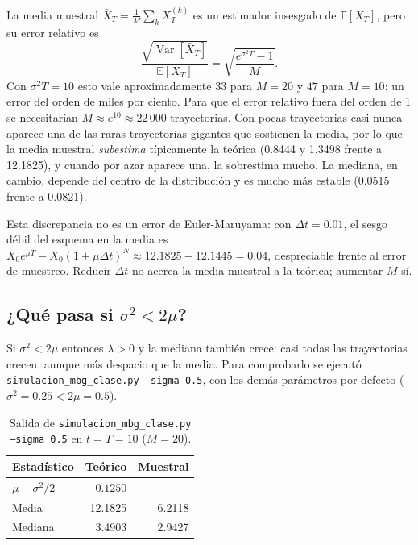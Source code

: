 \documentclass[11pt,a4paper]{article}
\newcommand{\E}{\mathbb{E}}
\newcommand{\Var}{\operatorname{Var}}
\begin{document}
La media muestral $\bar X_T = \frac1M \sum_k X_T^{(k)}$ es un estimador insesgado de $\E[X_T]$, pero su error relativo es
\begin{equation}
    \frac{\sqrt{\Var[\bar X_T]}}{\E[X_T]} = \sqrt{\frac{e^{\sigma^2 T} - 1}{M}}.
\end{equation}
Con $\sigma^2T = 10$ esto vale aproximadamente $33$ para $M = 20$ y $47$ para $M = 10$: un error del orden de miles por ciento. Para que el error relativo fuera del orden de 1 se necesitarían $M \approx e^{10} \approx 22\,000$ trayectorias. Con pocas trayectorias casi nunca aparece una de las raras trayectorias gigantes que sostienen la media, por lo que la media muestral \emph{subestima} típicamente la teórica (0.8444 y 1.3498 frente a 12.1825), y cuando por azar aparece una, la sobrestima mucho. La mediana, en cambio, depende del centro de la distribución y es mucho más estable (0.0515 frente a 0.0821).

Esta discrepancia no es un error de Euler-Maruyama: con $\Delta t = 0.01$, el sesgo débil del esquema en la media es $X_0e^{\mu T} - X_0(1 + \mu\Delta t)^N \approx 12.1825 - 12.1445 = 0.04$, despreciable frente al error de muestreo. Reducir $\Delta t$ no acerca la media muestral a la teórica; aumentar $M$ sí.

\subsection{\texorpdfstring{¿Qué pasa si $\sigma^2 < 2\mu$?}{¿Qué pasa si sigma² < 2 mu?}}

Si $\sigma^2 < 2\mu$ entonces $\lambda > 0$ y la mediana también crece: casi todas las trayectorias crecen, aunque más despacio que la media. Para comprobarlo se ejecutó \texttt{simulacion\_mbg\_clase.py --sigma 0.5}, con los demás parámetros por defecto ($\sigma^2 = 0.25 < 2\mu = 0.5$).

\begin{table}[H]
    \centering
    \caption{Salida de \texttt{simulacion\_mbg\_clase.py --sigma 0.5} en $t = T = 10$ ($M = 20$).}
    \label{tab:sigma05}
    \begin{tabular}{lrr}
        \toprule
        Estadístico & Teórico & Muestral \\
        \midrule
        $\mu - \sigma^2/2$ & $0.1250$ & --- \\
        Media   & 12.1825 & 6.2118 \\
        Mediana & 3.4903  & 2.9427 \\
        \bottomrule
    \end{tabular}
\end{table}
\end{document}
